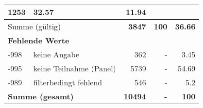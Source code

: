 \begin{longtable}{lXrrr}
       \num{1253} &
       \num[round-mode=places,round-precision=2]{32.57} &
         \num[round-mode=places,round-precision=2]{11.94} \\
     \midrule
     \multicolumn{2}{l}{Summe (gültig)} &
       \textbf{\num{3847}} &
     \textbf{\num{100}} &
       \textbf{\num[round-mode=places,round-precision=2]{36.66}} \\
     \multicolumn{5}{l}{\textbf{Fehlende Werte}}\\
       -998 &
       keine Angabe &
         \num{362} &
        - &
         \num[round-mode=places,round-precision=2]{3.45} \\
       -995 &
       keine Teilnahme (Panel) &
         \num{5739} &
        - &
         \num[round-mode=places,round-precision=2]{54.69} \\
       -989 &
       filterbedingt fehlend &
         \num{546} &
        - &
         \num[round-mode=places,round-precision=2]{5.2} \\
     \midrule
     \multicolumn{2}{l}{\textbf{Summe (gesamt)}} &
          \textbf{\num{10494}} &
        \textbf{-} &
        \textbf{\num{100}} \\
     \bottomrule
     \end{longtable}
     
